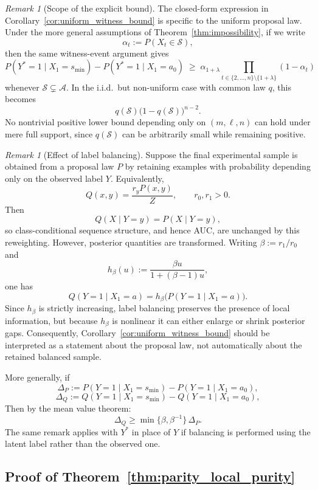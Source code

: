 \documentclass{article}
\theoremstyle{plain}
\theoremstyle{definition}
\theoremstyle{remark}
\newtheorem{remark}[theorem]{Remark}
\begin{document}
\begin{remark}[Scope of the explicit bound]
\label{rem:scope_uniform_bound}
The closed-form expression in Corollary~\ref{cor:uniform_witness_bound} is
specific to the uniform proposal law. Under the more general assumptions of
Theorem~\ref{thm:impossibility}, if we write
\[
\alpha_t := P(X_t\in\mathcal{S}),
\]
then the same witness-event argument gives
\[
P(Y^*=1\mid X_1=s_{\min})
-
P(Y^*=1\mid X_1=a_0)
\;\ge\;
\alpha_{1+\lambda}
\prod_{t\in\{2,\ldots,n\}\setminus\{1+\lambda\}}(1-\alpha_t)
\]
whenever $\mathcal{S}\subsetneq\mathcal{A}$.
In the i.i.d.\ but non-uniform case with common law $q$, this becomes
\[
q(\mathcal{S})\bigl(1-q(\mathcal{S})\bigr)^{n-2}.
\]
No nontrivial positive lower bound depending only on $(m,\ell,n)$ can hold under
mere full support, since $q(\mathcal{S})$ can be arbitrarily small while
remaining positive.
\end{remark}

\begin{remark}[Effect of label balancing]
\label{rem:label_balancing}
Suppose the final experimental sample is obtained from a proposal law $P$ by
retaining examples with probability depending only on the observed label $Y$.
Equivalently,
\[
Q(x,y)=\frac{r_y P(x,y)}{Z},
\qquad r_0,r_1>0.
\]
Then
\[
Q(X\mid Y=y)=P(X\mid Y=y),
\]
so class-conditional sequence structure, and hence AUC, are unchanged by this
reweighting. However, posterior quantities are transformed. Writing
$\beta:=r_1/r_0$ and
\[
h_\beta(u):=\frac{\beta u}{1+(\beta-1)u},
\]
one has
\[
Q(Y=1\mid X_1=a)
=
h_\beta\!\bigl(P(Y=1\mid X_1=a)\bigr).
\]
Since $h_\beta$ is strictly increasing, label balancing preserves the presence of
local information, but because $h_\beta$ is nonlinear it can either enlarge or
shrink posterior gaps. Consequently,
Corollary~\ref{cor:uniform_witness_bound} should be interpreted as a statement
about the proposal law, not automatically about the retained balanced sample.

More generally, if
\[
\Delta_P := P(Y=1\mid X_1=s_{\min}) - P(Y=1\mid X_1=a_0),
\]
\[
\Delta_Q := Q(Y=1\mid X_1=s_{\min}) - Q(Y=1\mid X_1=a_0),
\]
Then by the mean value theorem:
\[
\Delta_Q \ge \min\{\beta,\beta^{-1}\}\,\Delta_P.
\]
The same remark applies with $Y^*$ in place of $Y$ if balancing is performed
using the latent label rather than the observed one.
\end{remark}



\subsection{Proof of Theorem~\ref{thm:parity_local_purity}}
\label{appendix:proof_parity_local_purity}
\end{document}
